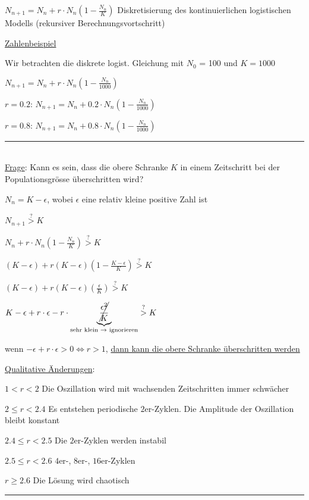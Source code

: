 \documentclass[18pt,a4paper]{scrreprt}
\begin{document}
$N_{n+1} = N_n + r\cdot N_n (1-\frac{N_n}{K})$ Diskretisierung des kontinuierlichen logistischen Modells (rekursiver Berechnungsvortschritt)

\uline{Zahlenbeispiel}

Wir betrachten die diskrete logist. Gleichung mit $N_0$ = 100 und $K=1000$

$N_{n+1} = N_n + r\cdot N_n (1-\frac{N_n}{1000})$

$r = 0.2$: $N_{n+1} = N_n + 0.2 \cdot N_n (1-\frac{N_n}{1000})$

$r = 0.8$: $N_{n+1} = N_n + 0.8 \cdot N_n (1-\frac{N_n}{1000})$

\rule{\textwidth}{0.4mm}\\

\uline{Frage}: Kann es sein, dass die obere Schranke $K$ in einem Zeitschritt bei der Populationsgrösse überschritten wird?

$N_n = K - \epsilon$, wobei $\epsilon$ eine relativ kleine positive Zahl ist

$N_{n+1} \stackrel{?}{>} K$

$N_n + r\cdot N_n(1-\frac{N_n}{K}) \stackrel{?}{>} K$

$(K-\epsilon) + r(K-\epsilon) (1-\frac{K-\epsilon}{K})\stackrel{?}{>} K$

$(K-\epsilon) + r(K-\epsilon) (\frac{\epsilon}{K})\stackrel{?}{>} K$

$K-\epsilon + r\cdot\epsilon - r \cdot \underbrace{\cancel{\frac{\epsilon^2}{K}}}_{\text{sehr klein $\rightarrow$ ignorieren}}\stackrel{?}{>} K$

wenn $-\epsilon + r\cdot \epsilon > 0 \Leftrightarrow r>1$, \uline{dann kann die obere Schranke überschritten werden}

\uline{Qualitative Änderungen}:

\uline{$1<r<2$} Die Oszillation wird mit wachsenden Zeitschritten immer schwächer

\uline{$2\leqslant r < 2.4$} Es entstehen periodische $2$er-Zyklen. Die Amplitude der Oszillation bleibt konstant

\uline{$2.4 \leqslant r < 2.5$} Die $2$er-Zyklen werden instabil

\uline{$2.5 \leqslant r < 2.6$} $4$er-, $8$er-, $16$er-Zyklen

\uline{$r \geqslant 2.6$} Die Lösung wird chaotisch

\rule{\textwidth}{0.4mm}\\
\end{document}
